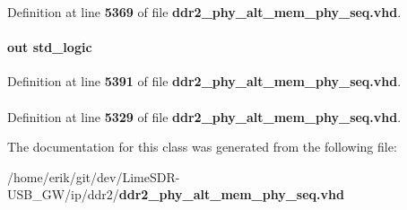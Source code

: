 Definition at line {\bf 5369} of file {\bf ddr2\+\_\+phy\+\_\+alt\+\_\+mem\+\_\+phy\+\_\+seq.\+vhd}.

\paragraph[{trefi\+\_\+failure}]{ {\bfseries \textcolor{keywordflow}{out}\textcolor{vhdlchar}{ }} {\bfseries \textcolor{comment}{std\+\_\+logic}\textcolor{vhdlchar}{ }} \hspace{0.3cm}{\ttfamily [Port]}}\label{classddr2__phy__alt__mem__phy__admin_a610b67ed6ff479e2a7917249ef2f5d0c}


Definition at line {\bf 5391} of file {\bf ddr2\+\_\+phy\+\_\+alt\+\_\+mem\+\_\+phy\+\_\+seq.\+vhd}.

\paragraph[{work}]{\hspace{0.3cm}{\ttfamily [Library]}}\label{classddr2__phy__alt__mem__phy__admin_a9f49de6f5eed5b4488cba6c9cdd1c215}


Definition at line {\bf 5329} of file {\bf ddr2\+\_\+phy\+\_\+alt\+\_\+mem\+\_\+phy\+\_\+seq.\+vhd}.



The documentation for this class was generated from the following file\+:\begin{DoxyCompactItemize}
\item 
/home/erik/git/dev/\+Lime\+S\+D\+R-\/\+U\+S\+B\+\_\+\+G\+W/ip/ddr2/{\bf ddr2\+\_\+phy\+\_\+alt\+\_\+mem\+\_\+phy\+\_\+seq.\+vhd}\end{DoxyCompactItemize}
